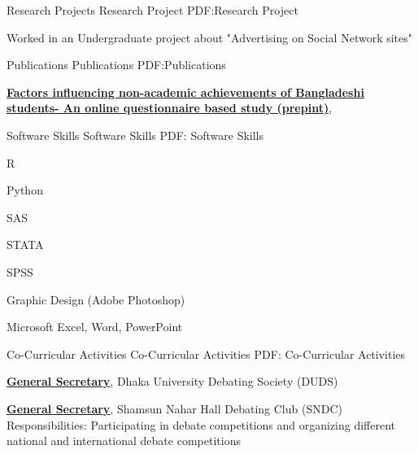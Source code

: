 \documentclass[letterpaper,MMMyyyy,nonstopmode]{simpleresumecv}
\begin{document}
\begin{Body}
\begin{Detail}
\begin{Detail}
\begin{Detail}

\Section
{Research \newline
Projects}
{Research Project}
{PDF:Research Project}

\BulletItem
Worked in an Undergraduate project
about "Advertising on Social Network sites"
\hfill
{}



\Section
{Publications}
{Publications}
{PDF:Publications}

\Entry
\href{http://www.example.com/my-society}
{\textbf{Factors influencing non-academic achievements of Bangladeshi students- An online questionnaire based study (prepint)}},

\begingroup
\renewcommand{\MaxNumberedItem}{[88]}
\href{https://www.researchsquare.com/article/rs-410311/latest.pdf}
\endgroup


\Section
{Software Skills}
{Software Skills}
{PDF: Software Skills}

\BulletItem
R

\Gap
\BulletItem
Python

\Gap
\BulletItem
SAS

\Gap
\BulletItem
STATA

\Gap
\BulletItem
SPSS

\Gap
\BulletItem
Graphic Design (Adobe Photoshop)

\Gap
\BulletItem
Microsoft Excel, Word, PowerPoint


\Section
{Co-Curricular\newline
Activities}
{Co-Curricular Activities}
{PDF: Co-Curricular Activities}

\Entry
\href{http://www.example.com/my-company}
{\textbf{General Secretary}},
Dhaka University Debating Society (DUDS)

\Entry
\href{http://www.example.com/my-company}
{\textbf{General Secretary}},
Shamsun Nahar Hall Debating Club (SNDC)
\Gap
\BulletItem
Responsibilities: Participating in debate competitions and organizing different national and international debate competitions


\end{Detail}
\end{Detail}
\end{Detail}
\end{Body}
\end{document}
